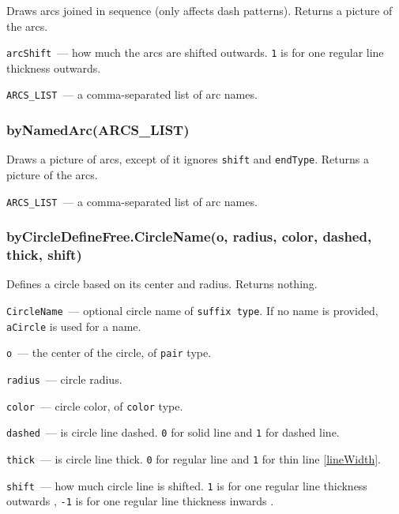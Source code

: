 	Draws arcs joined in sequence (only affects dash patterns). Returns a picture of the arcs.
	
	\texttt{arcShift}~— how much the arcs are shifted outwards. \texttt{1} is for one regular line thickness outwards.
	
	\texttt{ARCS\_LIST}~— a comma-separated list of arc names.
	
\subsubsection{byNamedArc(ARCS\_LIST)}\label{byNamedArc}
	Draws a picture of arcs, except of it ignores \texttt{shift} and \texttt{endType}. Returns a picture of the arcs.
	
	\texttt{ARCS\_LIST}~— a comma-separated list of arc names.


\subsubsection{byCircleDefineFree.CircleName(o, radius, color, dashed, thick, shift)}\label{byCircleDefineFree}
	
	Defines a circle based on its center and radius. Returns nothing.
	
	
	\texttt{CircleName}~— optional circle name of \texttt{suffix type}. If no name is provided, \texttt{aCircle} is used for a name.
	
	\texttt{o}~— the center of the circle, of \texttt{pair} type.
	
	\texttt{radius}~— circle radius.
	
	\texttt{color}~— circle color, of \texttt{color} type.
	
	\texttt{dashed}~— is circle line dashed. \texttt{0} for solid line and \texttt{1} for dashed line.
	
	\texttt{thick}~— is circle line thick. \texttt{0} for regular line and \texttt{1} for thin line \ref{lineWidth}.
	
	\texttt{shift}~— how much circle line is shifted. \texttt{1} is for one regular line thickness outwards
	, \texttt{-1} is for one regular line thickness inwards
	.

